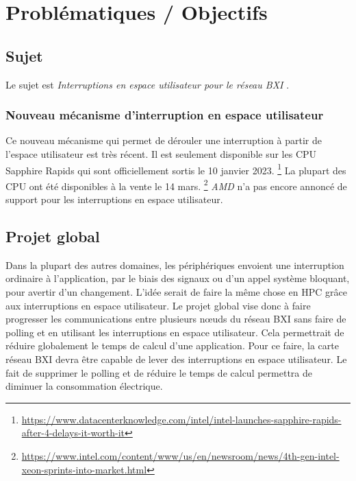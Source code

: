 \section{Problématiques / Objectifs} %

\subsection{Sujet}

Le sujet est \emph{Interruptions en espace utilisateur pour le réseau BXI} \cite{internshipSubject}.

\subsubsection{Nouveau mécanisme d'interruption en espace utilisateur}

Ce nouveau mécanisme qui permet de dérouler une interruption à partir de l'espace utilisateur est très récent.
Il est seulement disponible sur les CPU \intel{} Sapphire Rapids qui sont officiellement sortis le 10 janvier 2023.
\footnote{\url{https://www.datacenterknowledge.com/intel/intel-launches-sapphire-rapids-after-4-delays-it-worth-it}}
La plupart des CPU ont été disponibles à la vente le 14 mars.
\footnote{\url{https://www.intel.com/content/www/us/en/newsroom/news/4th-gen-intel-xeon-sprints-into-market.html}}
\emph{AMD} n'a pas encore annoncé de support pour les interruptions en espace utilisateur.

\subsection{Projet global}

Dans la plupart des autres domaines, les périphériques envoient une interruption ordinaire à l'application, par le biais des signaux ou d'un appel système bloquant, pour avertir d'un changement.
L'idée serait de faire la même chose en HPC grâce aux interruptions en espace utilisateur.
Le projet global vise donc à faire progresser les communications entre plusieurs nœuds du réseau BXI sans faire de polling et en utilisant les interruptions en espace utilisateur.
Cela permettrait de réduire globalement le temps de calcul d'une application.
Pour ce faire, la carte réseau BXI devra être capable de lever des interruptions en espace utilisateur.
Le fait de supprimer le polling et de réduire le temps de calcul permettra de diminuer la consommation électrique.


